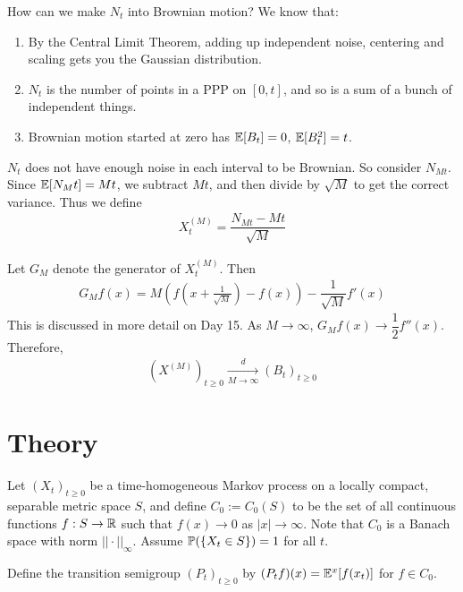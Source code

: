 \documentclass[classnotes]{fillsntsx}
\begin{document}
\begin{exmp}{How can we make $N_t$ into Brownian motion?}
We know that:
\begin{enumerate}
\item By the Central Limit Theorem, adding up independent noise, centering and scaling gets you the Gaussian distribution. 
\item $N_t$ is the number of points in a PPP on $[0, t]$, and so is a sum of a bunch of independent things. 
\item Brownian motion started at zero has $\E[B_t] = 0$, $\E[B_t^2] = t$.
\end{enumerate}

$N_t$ does not have enough noise in each interval to be Brownian. So consider $N_{Mt}$. Since
$\E[N_Mt] = Mt$, we subtract $Mt$, and then divide by $\sqrt{M}$ to get the correct variance.
Thus we define
$$\begin{aligned}
X_t^{(M)} = \dfrac{ N_{Mt} - Mt}{\sqrt{M}}
\end{aligned}$$

Let $G_M$ denote the generator of $X_t^{(M)}$. Then
$$\begin{aligned}
G_M f(x) = M \left( f \left( x+ \frac{1}{\sqrt{M}}\right) - f(x) \right) - \dfrac{1}{\sqrt{M}} f'(x)
\end{aligned}$$
This is discussed in more detail on Day 15. 
As $M \to \infty$, $G_M f(x) \to \dfrac{1}{2} f''(x)$. 
Therefore, 
$$\begin{aligned}
(X^{(M)})_{t \geq 0} \xrightarrow[M \to \infty]{d} (B_t)_{t \geq 0}
\end{aligned}$$
\end{exmp}



\section{Theory}

Let $(X_t)_{t \geq 0}$ be a time-homogeneous Markov process on a locally compact, separable metric space $S$, 
and define
$C_0 := C_0(S)$ to be the set of all continuous functions $f: S \to \R$ such that $f(x) \to 0$ as $|x| \to \infty$. 
Note that $C_0$ is a Banach space with norm $|| \cdot ||_{\infty}$. Assume $\P(\{X_t \in S \}) = 1$ for all $t$. 

\begin{defn}
Define the transition semigroup $(P_t)_{t \geq 0}$ by $(P_t f)(x) = \E^{x}[f(x_t)]$ for $f \in C_0$. 
\end{defn}
\end{document}
